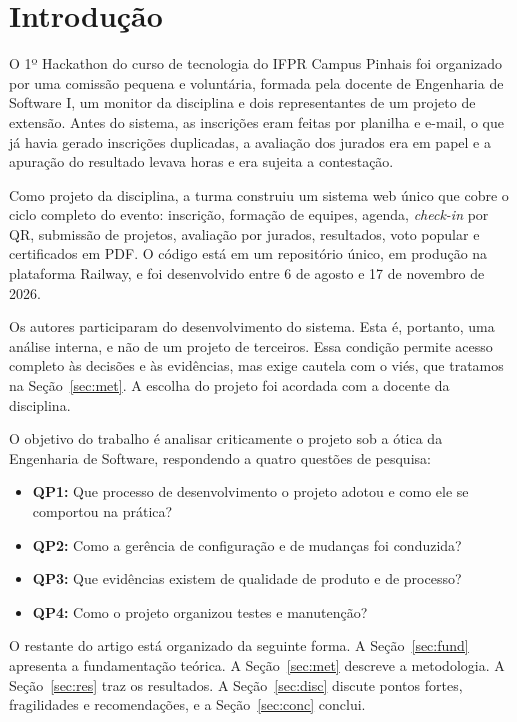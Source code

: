 \section{Introdução}

O 1º Hackathon do curso de tecnologia do IFPR Campus Pinhais foi organizado por uma comissão pequena e voluntária, formada pela docente de Engenharia de Software I, um monitor da disciplina e dois representantes de um projeto de extensão. Antes do sistema, as inscrições eram feitas por planilha e e-mail, o que já havia gerado inscrições duplicadas, a avaliação dos jurados era em papel e a apuração do resultado levava horas e era sujeita a contestação.

Como projeto da disciplina, a turma construiu um sistema web único que cobre o ciclo completo do evento: inscrição, formação de equipes, agenda, \textit{check-in} por QR, submissão de projetos, avaliação por jurados, resultados, voto popular e certificados em PDF. O código está em um repositório único, em produção na plataforma Railway, e foi desenvolvido entre 6 de agosto e 17 de novembro de 2026.

Os autores participaram do desenvolvimento do sistema. Esta é, portanto, uma análise interna, e não de um projeto de terceiros. Essa condição permite acesso completo às decisões e às evidências, mas exige cautela com o viés, que tratamos na Seção~\ref{sec:met}. A escolha do projeto foi acordada com a docente da disciplina.

O objetivo do trabalho é analisar criticamente o projeto sob a ótica da Engenharia de Software, respondendo a quatro questões de pesquisa:

\begin{itemize}
  \item \textbf{QP1:} Que processo de desenvolvimento o projeto adotou e como ele se comportou na prática?
  \item \textbf{QP2:} Como a gerência de configuração e de mudanças foi conduzida?
  \item \textbf{QP3:} Que evidências existem de qualidade de produto e de processo?
  \item \textbf{QP4:} Como o projeto organizou testes e manutenção?
\end{itemize}

O restante do artigo está organizado da seguinte forma. A Seção~\ref{sec:fund} apresenta a fundamentação teórica. A Seção~\ref{sec:met} descreve a metodologia. A Seção~\ref{sec:res} traz os resultados. A Seção~\ref{sec:disc} discute pontos fortes, fragilidades e recomendações, e a Seção~\ref{sec:conc} conclui.
